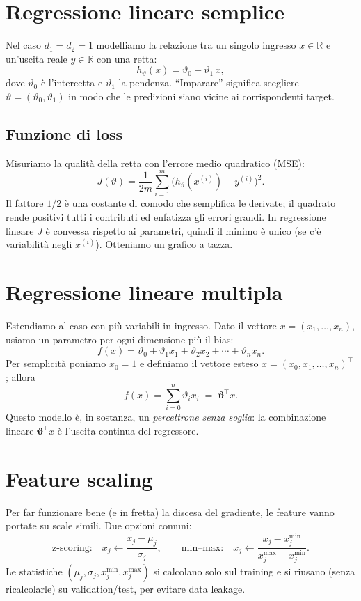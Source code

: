\section{Regressione lineare semplice}
Nel caso \(d_1=d_2=1\) modelliamo la relazione tra un singolo ingresso \(x\in\mathbb{R}\) e
un'uscita reale \(y\in\mathbb{R}\) con una retta:
\[
h_\vartheta(x)=\vartheta_0+\vartheta_1\,x,
\]
dove \(\vartheta_0\) è l'intercetta e \(\vartheta_1\) la pendenza. ``Imparare'' significa scegliere
\(\vartheta=(\vartheta_0,\vartheta_1)\) in modo che le predizioni siano vicine ai corrispondenti target.

\subsection{Funzione di loss}
Misuriamo la qualità della retta con l'errore medio quadratico (MSE):
\[
J(\vartheta)=\frac{1}{2m}\sum_{i=1}^{m}\big(h_\vartheta(x^{(i)})-y^{(i)}\big)^2.
\]
Il fattore \(1/2\) è una costante di comodo che semplifica le derivate; il quadrato rende
positivi tutti i contributi ed enfatizza gli errori grandi. In regressione lineare \(J\) è
convessa rispetto ai parametri, quindi il minimo è unico (se c'è variabilità negli \(x^{(i)}\)). Otteniamo un grafico a tazza.
\section{Regressione lineare multipla}
Estendiamo al caso con più variabili in ingresso. Dato il vettore
\(x=(x_1,\dots,x_n)\), usiamo un parametro per ogni dimensione più il bias:
\[
f(x)=\vartheta_0+\vartheta_1x_1+\vartheta_2x_2+\cdots+\vartheta_n x_n .
\]
Per semplicità poniamo \(x_0=1\) e definiamo il vettore esteso
\(
x=(x_0,x_1,\dots,x_n)^\top
\);
allora
\[
f(x)=\sum_{i=0}^n \vartheta_i x_i \;=\; \boldsymbol{\vartheta}^\top x.
\]
Questo modello è, in sostanza, un \emph{percettrone senza soglia}: la combinazione lineare
\(\boldsymbol{\vartheta}^\top x\) è l'uscita continua del regressore.

\section{Feature scaling}
Per far funzionare bene (e in fretta) la discesa del gradiente, le feature vanno portate
su scale simili. Due opzioni comuni:
\[
\text{z-scoring:}\quad x_j\leftarrow\frac{x_j-\mu_j}{\sigma_j},
\qquad
\text{min--max:}\quad x_j\leftarrow\frac{x_j-x_j^{\min}}{x_j^{\max}-x_j^{\min}}.
\]
Le statistiche \((\mu_j,\sigma_j,x_j^{\min},x_j^{\max})\) si calcolano solo sul training e
si riusano (senza ricalcolarle) su validation/test, per evitare data leakage.

